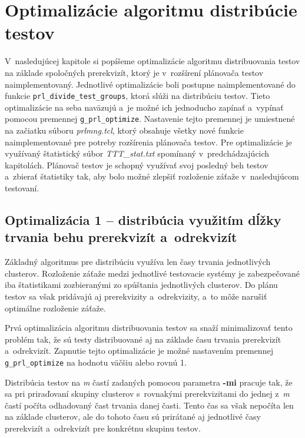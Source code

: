 %
%
\chapter{Optimalizácie algoritmu distribúcie testov}
\label{kapitola:optimalizacie}
V~nasledujúcej kapitole si popíšeme optimalizácie algoritmu distribuovania
testov na základe spoločných prerekvizít, ktorý je v~rozšírení plánovača 
testov naimplementovaný. 
Jednotlivé optimalizácie boli postupne naimplementované do funkcie 
\texttt{prl\_divide\_test\_groups}, ktorá slúži na distribúciu testov.
Tieto optimalizácie na seba naväzujú a~je možné ich jednoducho zapínať a~vypínať 
pomocou  premennej \texttt{g\_prl\_optimize}. 
Nastavenie tejto premennej je umiestnené 
na začiatku súboru \textit{prlmng.tcl}, ktorý obsahuje všetky nové funkcie
naimplementované pre potreby rozšírenia plánovača testov.
Pre optimalizácie je využívaný štatistický súbor \textit{TTT\_stat.txt}
spomínaný v~predchádzajúcich kapitolách. Plánovač testov je schopný
využívať svoj posledný beh testov a~zbierať štatistiky tak, aby bolo možné
zlepšiť rozloženie záťaže v~nasledujúcom testovaní.

\section{Optimalizácia 1 -- distribúcia využitím dĺžky trvania behu prerekvizít a~odrekvizít}
\label{sekcia:optimalizacia1}
Základný algoritmus pre distribúciu využíva len časy trvania jednotlivých clusterov.
Rozloženie záťaže medzi jednotlivé testovacie systémy je zabezpečované iba
štatistikami zozbieranými zo spúštania jednotlivých clusterov.
Do plánu testov sa však pridávajú aj prerekvizity a~odrekvizity, a~to môže
narušiť optimálne rozloženie záťaže. 

Prvá optimalizácia algoritmu distribuovania testov sa snaží minimalizovať
tento problém tak, že sú testy distribuované aj na základe
času trvania prerekvizít a~odrekvizít. Zapnutie tejto optimalizácie
je možné nastavením premennej \texttt{g\_prl\_optimize} na hodnotu 
väčšiu alebo rovnú 1.

Distribúcia testov na \textit{m} častí zadaných pomocou parametra \textbf{-mi}
pracuje tak, že sa pri priraďovaní skupiny clusterov s~rovnakými prerekvizitami
do jednej z~\textit{m} častí počíta odhadovaný čast trvania danej časti.
Tento čas sa však nepočíta len na základe clusterov, ale do tohoto času sú prirátané
aj jednotlivé časy prerekvizít a~odrekvizít pre konkrétnu skupinu testov.

